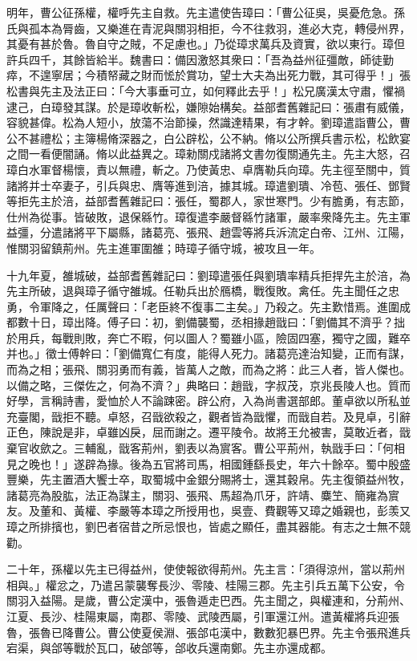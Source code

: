 \begin{pinyinscope}
明年，曹公征孫權，權呼先主自救。先主遣使告璋曰：「曹公征吳，吳憂危急。孫氏與孤本為脣齒，又樂進在青泥與關羽相拒，今不往救羽，進必大克，轉侵州界，其憂有甚於魯。魯自守之賊，不足慮也。」乃從璋求萬兵及資實，欲以東行。璋但許兵四千，其餘皆給半。魏書曰：備因激怒其衆曰：「吾為益州征彊敵，師徒勤瘁，不遑寧居；今積帑藏之財而恡於賞功，望士大夫為出死力戰，其可得乎！」張松書與先主及法正曰：「今大事垂可立，如何釋此去乎！」松兄廣漢太守肅，懼禍逮己，白璋發其謀。於是璋收斬松，嫌隙始構矣。益部耆舊雜記曰：張肅有威儀，容貌甚偉。松為人短小，放蕩不治節操，然識達精果，有才幹。劉璋遣詣曹公，曹公不甚禮松；主簿楊脩深器之，白公辟松，公不納。脩以公所撰兵書示松，松飲宴之間一看便闇誦。脩以此益異之。璋勑關戍諸將文書勿復關通先主。先主大怒，召璋白水軍督楊懷，責以無禮，斬之。乃使黃忠、卓膺勒兵向璋。先主徑至關中，質諸將并士卒妻子，引兵與忠、膺等進到涪，據其城。璋遣劉璝、冷苞、張任、鄧賢等拒先主於涪，益部耆舊雜記曰：張任，蜀郡人，家世寒門。少有膽勇，有志節，仕州為從事。皆破敗，退保緜竹。璋復遣李嚴督緜竹諸軍，嚴率衆降先主。先主軍益彊，分遣諸將平下屬縣，諸葛亮、張飛、趙雲等將兵泝流定白帝、江州、江陽，惟關羽留鎮荊州。先主進軍圍雒；時璋子循守城，被攻且一年。

十九年夏，雒城破，益部耆舊雜記曰：劉璋遣張任與劉璝率精兵拒捍先主於涪，為先主所破，退與璋子循守雒城。任勒兵出於鴈橋，戰復敗。禽任。先主聞任之忠勇，令軍降之，任厲聲曰：「老臣終不復事二主矣。」乃殺之。先主歎惜焉。進圍成都數十日，璋出降。傅子曰：初，劉備襲蜀，丞相掾趙戩曰：「劉備其不濟乎？拙於用兵，每戰則敗，奔亡不暇，何以圖人？蜀雖小區，險固四塞，獨守之國，難卒并也。」徵士傅幹曰：「劉備寬仁有度，能得人死力。諸葛亮達治知變，正而有謀，而為之相；張飛、關羽勇而有義，皆萬人之敵，而為之將：此三人者，皆人傑也。以備之略，三傑佐之，何為不濟？」典略曰：趙戩，字叔茂，京兆長陵人也。質而好學，言稱詩書，愛恤於人不論踈密。辟公府，入為尚書選部郎。董卓欲以所私並充臺閣，戩拒不聽。卓怒，召戩欲殺之，觀者皆為戩懼，而戩自若。及見卓，引辭正色，陳說是非，卓雖凶戾，屈而謝之。遷平陵令。故將王允被害，莫敢近者，戩棄官收歛之。三輔亂，戩客荊州，劉表以為賔客。曹公平荊州，執戩手曰：「何相見之晚也！」遂辟為掾。後為五官將司馬，相國鍾繇長史，年六十餘卒。蜀中殷盛豐樂，先主置酒大饗士卒，取蜀城中金銀分賜將士，還其穀帛。先主復領益州牧，諸葛亮為股肱，法正為謀主，關羽、張飛、馬超為爪牙，許靖、麋笁、簡雍為賔友。及董和、黃權、李嚴等本璋之所授用也，吳壹、費觀等又璋之婚親也，彭羡又璋之所排擯也，劉巴者宿昔之所忌恨也，皆處之顯任，盡其器能。有志之士無不競勸。

二十年，孫權以先主已得益州，使使報欲得荊州。先主言：「須得涼州，當以荊州相與。」權忿之，乃遣呂蒙襲奪長沙、零陵、桂陽三郡。先主引兵五萬下公安，令關羽入益陽。是歲，曹公定漢中，張魯遁走巴西。先主聞之，與權連和，分荊州、江夏、長沙、桂陽東屬，南郡、零陵、武陵西屬，引軍還江州。遣黃權將兵迎張魯，張魯已降曹公。曹公使夏侯淵、張郃屯漢中，數數犯暴巴界。先主令張飛進兵宕渠，與郃等戰於瓦口，破郃等，郃收兵還南鄭。先主亦還成都。


\end{pinyinscope}
